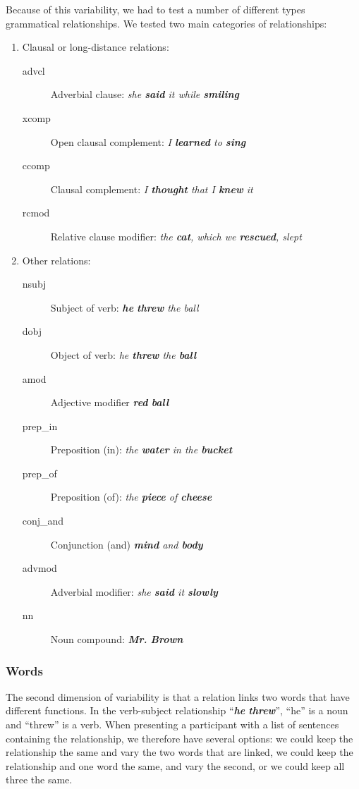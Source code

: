 Because of this variability, we had to test a number of different types grammatical relationships. We tested two main categories of relationships:
\begin{enumerate}
\item Clausal or long-distance relations:
	\begin{description}
		\item[advcl] Adverbial clause: \emph{  she \textbf{said} it while \textbf{smiling}}
		\item [xcomp] Open clausal complement:  \emph{I \textbf{learned} to \textbf{sing} }
		\item [ccomp] Clausal complement:  \emph{ I \textbf{thought} that I \textbf{knew} it}
		\item [rcmod] Relative clause modifier:  \emph{the \textbf{cat}, which we \textbf{rescued}, slept }
	\end{description}
\item Other relations:
		\begin{description}
			\item[nsubj] Subject of verb: \emph{\textbf{he} \textbf{threw} the ball}
			\item [dobj] Object of verb:  \emph{ he \textbf{threw} the \textbf{ball}}
			\item [amod] Adjective modifier \emph{\textbf{red} \textbf{ball}}
			\item [prep\_in]  Preposition (in): \emph{ the \textbf{water} in the \textbf{bucket}}
			\item [prep\_of]	Preposition (of):  \emph{ the \textbf{piece} of \textbf{cheese}}
			\item [conj\_and]  Conjunction (and)  \emph{ \textbf{mind} and \textbf{body}}
		\item[advmod] Adverbial modifier: \emph{  she \textbf{said} it \textbf{slowly}}
		\item [nn] Noun compound:  \emph{ \textbf{Mr.}  \textbf{Brown}}
		\end{description}
\end{enumerate}
\subsubsection{Words}
The second dimension of variability is that a relation links two words that have different functions. In the verb-subject relationship ``\emph{\textbf{he} \textbf{threw}}'', ``he'' is a noun and ``threw'' is a verb. When presenting a participant with a list of sentences containing the relationship, we therefore have several options: we could keep the relationship the same and vary the two words that are linked,  we could keep the relationship and one word the same, and vary the second, or we could keep all three the same.


